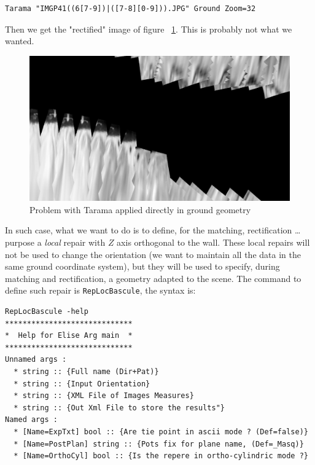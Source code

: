 \begin{verbatim}
Tarama "IMGP41((6[7-9])|([7-8][0-9])).JPG" Ground Zoom=32
\end{verbatim}

Then we get the "rectified" image of figure ~\ref{FIG:PBRec:StMartin}. This
is probably not what we wanted.


\begin{figure}
\begin{center}
\includegraphics[width=120mm]{FIGS/MurSaintMartin/TA_PB_LeChantier.jpg}
\end{center}
\caption{Problem with Tarama applied directly in ground geometry}
\label{FIG:PBRec:StMartin}
\end{figure}

In such case, what we want to do is to define, for the matching, rectification \dots
purpose a \emph{local} repair with $Z$ axis orthogonal to the wall. These local repairs
will not be used to change the orientation (we want to maintain all the data in the
same ground coordinate system), but they will be used to specify, during matching
and rectification, a geometry adapted to the scene.
The command to define such repair is {\tt RepLocBascule}, the syntax is:

\begin{verbatim}
RepLocBascule -help
*****************************
*  Help for Elise Arg main  *
*****************************
Unnamed args : 
  * string :: {Full name (Dir+Pat)}
  * string :: {Input Orientation}
  * string :: {XML File of Images Measures}
  * string :: {Out Xml File to store the results"}
Named args : 
  * [Name=ExpTxt] bool :: {Are tie point in ascii mode ? (Def=false)}
  * [Name=PostPlan] string :: {Pots fix for plane name, (Def=_Masq)}
  * [Name=OrthoCyl] bool :: {Is the repere in ortho-cylindric mode ?}
\end{verbatim}

